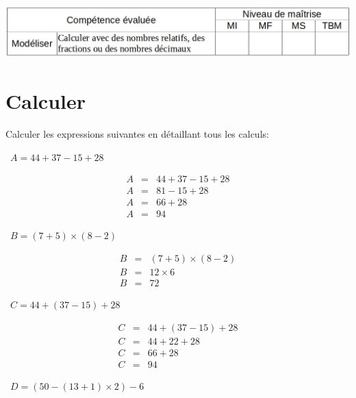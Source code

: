 	\includegraphics[scale=0.4]{competences}
	
	\section{Calculer}
	Calculer les expressions suivantes en détaillant tous les calculs:
	\begin{questions}
		
		{\LARGE \question[2]  $A =  44 + 37 - 15 + 28$}
		
		{\LARGE \begin{solution}
			\begin{eqnarray*}
				A &=& 44 + 37 - 15 + 28 \\
				A &=& 81 - 15 + 28 \\
				A &=& 66 + 28 \\
				A &=& 94
			\end{eqnarray*}
		\end{solution}}
		
		
		{\LARGE \question[2]  $B = (7 + 5) \times (8 - 2)$}
		
		{\LARGE \begin{solution}
			\begin{eqnarray*}
			B &=& (7 + 5) \times (8 - 2)\\
			B &=& 12 \times 6 \\			
			B &=& 72
			\end{eqnarray*}
		\end{solution}}
		
		\newpage
		{\LARGE \question[2]  $C =  44 + (37 - 15) + 28$}
		
		{\LARGE \begin{solution}
			\begin{eqnarray*}
			C &=&  44 + (37 - 15) + 28\\
			C &=&  44 + 22 + 28\\
			C &=& 66 + 28\\
			C &=& 94
			\end{eqnarray*}
		\end{solution}}
		
		{\LARGE \question[2]  $D = (50 - (13 + 1) \times 2) - 6$}
		

\end{questions}
